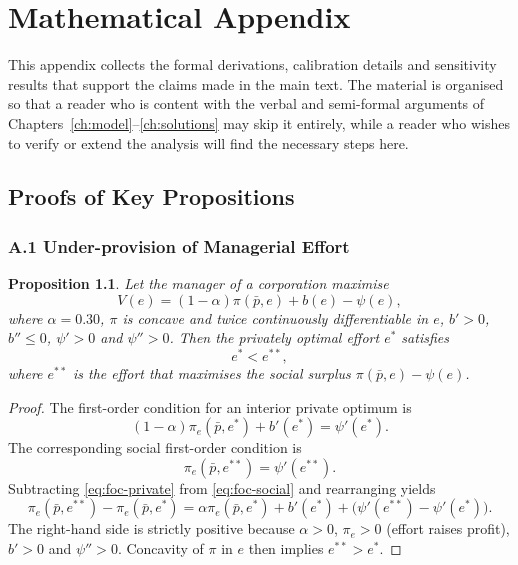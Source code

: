 \documentclass[12pt,anyside]{book}
\theoremstyle{definition}
\theoremstyle{plain}
\newtheorem{proposition}{Proposition}[chapter]
\theoremstyle{remark}
\begin{document}
\backmatter
\appendix

\chapter{Mathematical Appendix}
\label{app:math}

This appendix collects the formal derivations, calibration details and sensitivity results that support the claims made in the main text. The material is organised so that a reader who is content with the verbal and semi-formal arguments of Chapters~\ref{ch:model}--\ref{ch:solutions} may skip it entirely, while a reader who wishes to verify or extend the analysis will find the necessary steps here.

\section{Proofs of Key Propositions}

\subsection*{A.1 Under-provision of Managerial Effort}

\begin{proposition}
\label{prop:effort}
Let the manager of a corporation maximise
\[
V(e)=(1-\alpha)\pi(\bar{p},e)+b(e)-\psi(e),
\]
where $\alpha=0.30$, $\pi$ is concave and twice continuously differentiable in $e$, $b'>0$, $b''\le0$, $\psi'>0$ and $\psi''>0$. Then the privately optimal effort $e^*$ satisfies
\[
e^*<e^{**},
\]
where $e^{**}$ is the effort that maximises the social surplus $\pi(\bar{p},e)-\psi(e)$.
\end{proposition}

\begin{proof}
The first-order condition for an interior private optimum is
\begin{equation}
\label{eq:foc-private}
(1-\alpha)\pi_e(\bar{p},e^*)+b'(e^*)=\psi'(e^*).
\end{equation}
The corresponding social first-order condition is
\begin{equation}
\label{eq:foc-social}
\pi_e(\bar{p},e^{**})=\psi'(e^{**}).
\end{equation}
Subtracting \eqref{eq:foc-private} from \eqref{eq:foc-social} and rearranging yields
\[
\pi_e(\bar{p},e^{**})-\pi_e(\bar{p},e^*)=\alpha\pi_e(\bar{p},e^*)+b'(e^*)+\bigl(\psi'(e^{**})-\psi'(e^*)\bigr).
\]
The right-hand side is strictly positive because $\alpha>0$, $\pi_e>0$ (effort raises profit), $b'>0$ and $\psi''>0$. Concavity of $\pi$ in $e$ then implies $e^{**}>e^*$.
\end{proof}
\end{document}
